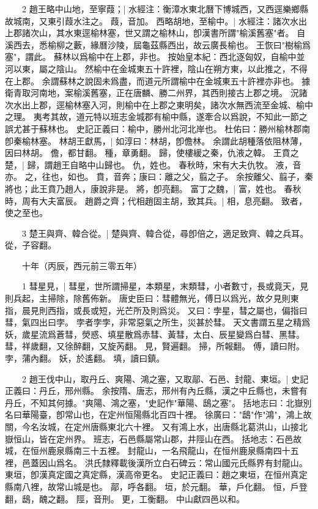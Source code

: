 　　2 趙王略中山地，至寧葭；|{
	水經注：衡漳水東北曆下博城西，又西逕樂鄉縣故城南，又東引葭水注之。
	葭，音加。
}
西略胡地，至榆中。|{
	水經注：諸次水出上郡諸次山，其水東逕榆林塞，世又謂之榆林山，卽漢書所謂"榆溪舊塞"者。
	自溪西去，悉榆柳之藪，緣曆沙陵，屆龜茲縣西出，故云廣長榆也。
	王恢曰"樹榆爲塞"，謂此。
	蘇林以爲榆中在上郡，非也。
	按始皇本紀：西北逐匈奴，自榆中並河以東，屬之陰山。
	然榆中在金城東五十許裡，陰山在朔方東，以此推之，不得在上郡。
	余謂蘇林之說固未爲盡，而道元所謂榆中在金城東五十許裡亦非也。
	據衛青取河南地，案榆溪舊塞，正在唐麟、勝二州界，其西則接古上郡之境。
	況諸次水出上郡，逕榆林塞入河，則榆中在上郡之東明矣，諸次水無西流至金城、榆中之理。
	夷考其故，道元特以班志金城郡有榆中縣，遂牽合以爲說，不知此一節之誤尤甚于蘇林也。
	史記正義曰：榆中，勝州北河北岸也。
	杜佑曰：勝州榆林郡南卽秦榆林塞。
}
林胡王獻馬，|{
	如淳曰：林胡，卽儋林。
	余謂此胡種落依阻林薄，因曰林胡。
	儋，都甘翻。
	種，章勇翻。
}
歸，使樓緩之秦，仇液之韓。
	王賁之楚，|{
	歸，謂趙王自略中山歸也。
	仇，姓也。
	春秋時，宋有大夫仇牧。
	液，音亦。
	之，往也，如也。
	賁，音奔；康曰：離之父，翦之子。
	余按離父、翦子，秦將也；此王賁乃趙人，康說非是。
	將，卽亮翻。
}
富丁之魏，|{
	富，姓也。
	春秋時，周有大夫富辰。
}
趙爵之齊；代相趙固主胡，致其兵。|{
	相，息亮翻。
	致者，使之至也。
}

　　3 楚王與齊、韓合從。|{
	楚與齊、韓合從，尋卽倍之，適足致齊、韓之兵耳。
	從，子容翻。
}

　　十年（丙辰，西元前三零五年）

　　1 彗星見，|{
	彗星，世所謂掃星，本類星，末類彗，小者數寸，長或竟天，見則兵起，主掃除，除舊佈新。
	唐史臣曰：彗體無光，傅日以爲光，故夕見則東指，晨見則西指，或長或短，光芒所及則爲災。
	又曰：孛星，彗之屬也，偏指曰彗，氣四出曰孛。
	孛者孛孛，非常惡氣之所生，災甚於彗。
	天文書謂五星之精爲妖，歲星流爲蒼彗，熒惑、填星散爲赤彗、黃彗，太白、辰星變爲白彗、黑彗。
	彗，祥歲翻，又徐醉翻，又旋芮翻。
	見，賢遍翻。
	掃，所報翻。
	傅，讀曰附。
	孛，蒲內翻。
	妖，於遙翻。
	填，讀曰鎮。
}

　　2 趙王伐中山，取丹丘、爽陽、鴻之塞，又取鄗、石邑、封龍、東垣。|{
	史記正義曰：丹丘，邢州縣。
	余按隋、唐志，邢州有內丘縣，漢之中丘縣也，未嘗有丹丘，不知其何據。"爽陽、鴻之塞，"史記作"華陽、鴟之塞"。
	括地志曰：北嶽別名曰華陽臺，卽常山也，在定州恒陽縣北百四十裡。
	徐廣曰："鴟"作"鴻"，鴻上故關，今名汝城，在定州唐縣東北六十裡。
	又有鴻上水，出唐縣北葛洪山，山接北嶽恒山，皆在定州界。
	班志，石邑縣屬常山郡，井陘山在西。
	括地志：石邑故城，在恒州鹿泉縣南三十五裡。
	封龍山，一名飛龍山，在恒州鹿泉縣南四十五裡，邑蓋因山爲名。
	洪氏隸釋載後漢所立白石碑云：常山國元氏縣界有封龍山。
	東垣，卽漢真定國之真定縣，漢高帝更名。
	史記正義曰：趙之東垣，在恒州真定縣南八裡，故常山城是也。
	鄗，呼各翻。
	垣，於元翻。
	華，戶化翻。
	恒，戶登翻，鴟，醜之翻。
	陘，音刑。
	更，工衡翻。
}
中山獻四邑以和。


